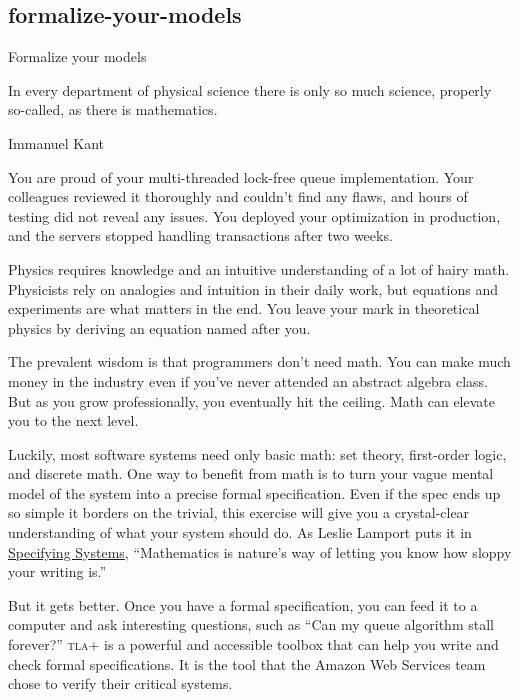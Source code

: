 \documentclass{article}
\begin{document}
\subsection{formalize-your-models}{Formalize your models}
\epigraph{
  In every department of physical science there is only so much science, properly so-called, as there is mathematics.
}{Immanuel Kant}

You are proud of your multi-threaded lock-free queue implementation.
Your colleagues reviewed it thoroughly and couldn't find any flaws, and hours of testing did not reveal any issues.
You deployed your optimization in production, and the servers stopped handling transactions after two weeks.

Physics requires knowledge and an intuitive understanding of a lot of hairy math.
Physicists rely on analogies and intuition in their daily work, but equations and experiments are what matters in the end.
You leave your mark in theoretical physics by deriving an equation named after you.

The prevalent wisdom is that programmers don't need math.
You can make much money in the industry even if you've never attended an abstract algebra class.
But as you grow professionally, you eventually hit the ceiling.
Math can elevate you to the next level.

Luckily, most software systems need only basic math: set theory, first-order logic, and discrete math.
One way to benefit from math is to turn your vague mental model of the system into a precise formal specification.
Even if the spec ends up so simple it borders on the trivial, this exercise will give you a crystal-clear understanding of what your system should do.
As Leslie Lamport puts it in \href{https://www.goodreads.com/book/show/2159127.Specifying_Systems}{Specifying Systems},
``Mathematics is nature's way of letting you know how sloppy your writing is.''

But it gets better.
Once you have a formal specification, you can feed it to a computer and ask interesting questions, such as ``Can my queue algorithm stall forever?''
\textsc{tla+} is a powerful and accessible toolbox that can help you write and check formal specifications.
It is the tool that the Amazon Web Services team chose to verify their critical systems.
\end{document}

